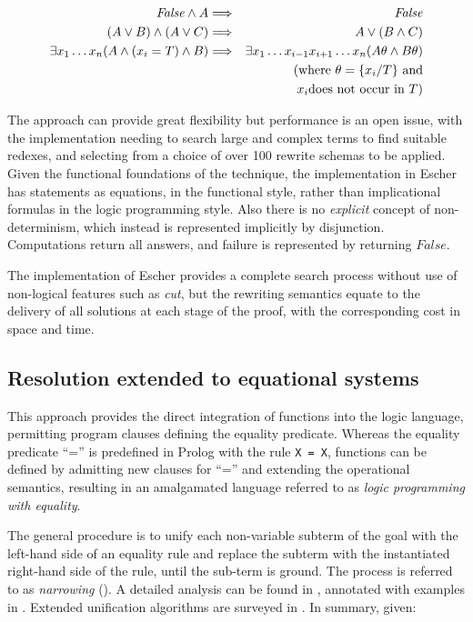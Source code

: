 \begin{eqnarray*}
\mathit{False} \wedge A & \Longrightarrow & \mathit{False}\\
(A \vee B) \wedge (A \vee C) & \Longrightarrow & A \vee (B \wedge C)\\
\exists x_1\ldots x_n(A \wedge (x_i = T) \wedge B) & \Longrightarrow &
  \exists x_1\ldots x_{i-1}x_{i+1}\ldots x_n(A\theta \wedge B\theta)\\
 & & (\mbox{where } \theta = \{x_i/T\} \mbox{ and} \\
 & & \hspace*{5mm}x_i \mbox{does not occur in } T)\\
\end{eqnarray*}

The approach can provide great flexibility but performance is an open issue, with
the implementation needing to search large and complex terms to find suitable redexes, and
selecting from a choice of over 100 rewrite schemas to be applied.  Given the functional
foundations of the technique, the implementation in Escher has statements as equations, in the
functional style, rather than implicational formulas in the logic programming style.  Also there
is no \textit{explicit} concept of non-determinism, which instead is represented implicitly by
disjunction.  Computations return all answers, and failure is represented by returning $False$.

The implementation of Escher provides a complete search process without use of non-logical
features such as \textit{cut}, but the rewriting semantics equate to the delivery of all
solutions at each stage of the proof, with the corresponding cost in space and time.

\subsection{Resolution extended to equational systems}

This approach provides the direct integration of functions into the logic language, permitting
program clauses defining the equality predicate.  Whereas the equality predicate ``='' is
predefined in Prolog with the rule \texttt{X = X},  functions can be defined by admitting
new clauses for ``='' and extending the operational semantics, resulting in an amalgamated
language referred to as \textit{logic programming with equality}.

The general procedure is to unify each non-variable subterm of the goal with the left-hand
side of an equality rule and replace the subterm with the instantiated right-hand side of the
rule, until the sub-term is ground.  The process is referred to as \textit{narrowing}
(\cite{RKKL85}).  A detailed analysis can be found in \cite{JD89},
annotated with examples in \cite{Han94}.  Extended unification algorithms
are surveyed in \cite{DvH87}. In summary, given:

